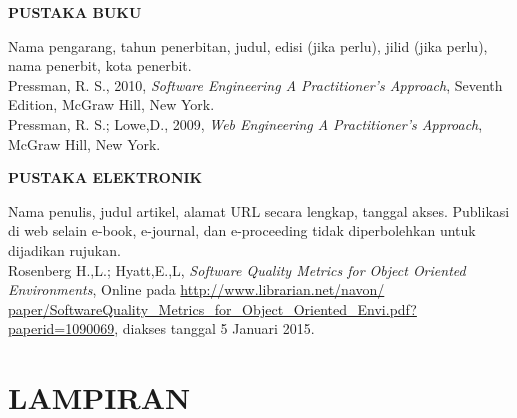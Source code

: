 \documentclass[oneside,listof=totoc]{scrbook}
\begin{document}
\vspace{0.5cm}

\begin{singlespace}
\noindent\textbf{PUSTAKA BUKU}\\

\begin{hangparas}{25pt}{1}
Nama pengarang, tahun penerbitan, judul, edisi (jika perlu), jilid (jika perlu), nama penerbit, kota penerbit.\\

Pressman, R. S., 2010, \textit{Software Engineering A Practitioner’s Approach}, Seventh Edition, McGraw Hill, New York.\\

Pressman, R. S.; Lowe,D., 2009, \textit{Web Engineering A Practitioner’s Approach}, McGraw Hill, New York.\\
\end{hangparas}

\vspace{0.5cm}

\noindent\textbf{PUSTAKA ELEKTRONIK}\\

\begin{hangparas}{25pt}{1}
Nama penulis, judul artikel, alamat URL secara lengkap, tanggal akses. Publikasi di web selain e-book, e-journal, dan e-proceeding tidak diperbolehkan untuk dijadikan rujukan.\\

Rosenberg H.,L.; Hyatt,E.,L, \textit{Software Quality Metrics for Object Oriented Environments}, Online pada \url{http://www.librarian.net/navon/ paper/SoftwareQuality_Metrics_for_Object_Oriented_Envi.pdf?paperid=1090069}, diakses tanggal 5 Januari 2015.\\
\end{hangparas}

\end{singlespace}

\chapter{LAMPIRAN}

\vspace{0.5cm}
\end{document}
